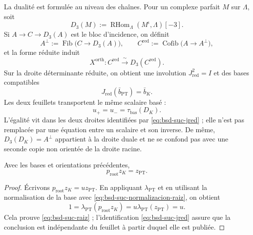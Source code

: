 La dualité est formulée au niveau des chaînes. Pour un complexe parfait
\(M\) sur \(\Lambda\), soit
\begin{equation}\label{eq:bsd-suc-d3}
 D_3(M):=
 \operatorname{RHom}_{\Lambda}(M^{\iota},\Lambda)[-3].
\end{equation}
Si \(A\to C\to D_3(A)\) est le bloc d'incidence, on définit
\begin{equation}\label{eq:bsd-suc-orth-red}
 A^{\perp}:=\operatorname{Fib}\bigl(C\to D_3(A)\bigr),
 \qquad
 C^{\mathrm{red}}:=\operatorname{Cofib}\bigl(A\to A^{\perp}\bigr),
\end{equation}
et la forme réduite induit
\begin{equation}\label{eq:bsd-suc-xorth}
 X^{\mathrm{orth}}:C^{\mathrm{red}}
 \xrightarrow{\ \sim\ }D_3(C^{\mathrm{red}}).
\end{equation}
Sur la droite déterminante réduite, on obtient une involution
\(J_{\mathrm{red}}^2=I\) et des bases compatibles
\begin{equation}\label{eq:bsd-suc-jred}
 J_{\mathrm{red}}(\bar b_{\mathrm{PT}})=\bar b_K.
\end{equation}
Les deux feuillets transportent le même scalaire basé :
\begin{equation}\label{eq:bsd-suc-doble-hoja}
 u_{+}=u_{-}=\tau_{\mathrm{bas}}(D_K).
\end{equation}
L'égalité vit dans les deux droites identifiées par
\eqref{eq:bsd-suc-jred} ; elle n'est pas remplacée par une équation entre un scalaire et
son inverse. De même, \(D_3(D_K)=A^{\perp}\) appartient à la droite duale et ne
se confond pas avec une seconde copie non orientée de la droite racine.

\begin{theorem}
\label{thm:bsd-suc-raiz-filler}
Avec les bases et orientations précédentes,
\begin{equation}\label{eq:bsd-suc-raiz}
 p_{\mathrm{root}}z_K=z_{\mathrm{PT}}.
\end{equation}
\end{theorem}

\begin{proof}
Écrivons
\(p_{\mathrm{root}}z_K=u z_{\mathrm{PT}}\). En appliquant
\(\lambda_{\mathrm{PT}}\) et en utilisant la normalisation de la base avec
\eqref{eq:bsd-suc-normalizacion-raiz}, on obtient
\[
 1=\lambda_{\mathrm{PT}}(p_{\mathrm{root}}z_K)
  =u\lambda_{\mathrm{PT}}(z_{\mathrm{PT}})=u.
\]
Cela prouve \eqref{eq:bsd-suc-raiz} ; l'identification
\eqref{eq:bsd-suc-jred} assure que la conclusion est indépendante du
feuillet à partir duquel elle est publiée.
\end{proof}

